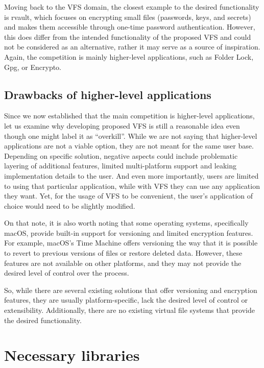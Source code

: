 Moving back to the VFS domain, the closest example to the desired functionality is rvault\cite{rvault}, which focuses on encrypting small files (passwords, keys, and secrets) and makes them accessible through one-time password authentication.
However, this does differ from the intended functionality of the proposed VFS and could not be considered as an alternative, rather it may serve as a source of inspiration.
Again, the competition is mainly higher-level applications, such as Folder Lock, Gpg, or Encrypto.

\subsection{Drawbacks of higher-level applications}\label{subsec:drawbacks-of-higher-level-applications}

Since we now established that the main competition is higher-level applications, let us examine why developing proposed VFS is still a reasonable idea even though one might label it as ``overkill''.
While we are not saying that higher-level applications are not a viable option, they are not meant for the same user base.
Depending on specific solution, negative aspects could include problematic layering of additional features, limited multi-platform support and leaking implementation details to the user.
And even more importantly, users are limited to using that particular application, while with VFS they can use any application they want.
Yet, for the usage of VFS to be convenient, the user's application of choice would need to be slightly modified.

On that note, it is also worth noting that some operating systems, specifically macOS, provide built-in support for versioning and limited encryption features.
For example, macOS's Time Machine offers versioning the way that it is possible to revert to previous versions of files or restore deleted data.
However, these features are not available on other platforms, and they may not provide the desired level of control over the process.

So, while there are several existing solutions that offer versioning and encryption features, they are usually platform-specific, lack the desired level of control or extensibility.
Additionally, there are no existing virtual file systems that provide the desired functionality.


\section{Necessary libraries}\label{sec:libs}


